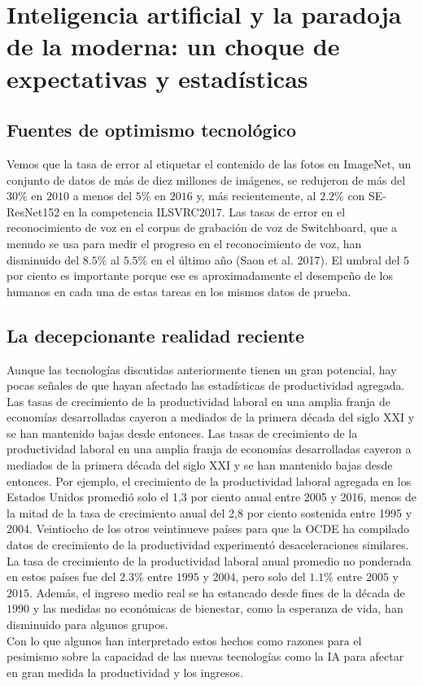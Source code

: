 \chapter{Inteligencia artificial y la paradoja de la moderna: un choque de expectativas y estadísticas}


\section{Fuentes de optimismo tecnológico}
Vemos que la tasa de error al etiquetar el contenido de las fotos en ImageNet, un conjunto de datos de más de diez millones de imágenes, se redujeron de más del $30\%$ en $2010$ a menos del $5\%$ en $2016$ y, más recientemente, al $2.2\%$ con SE-ResNet152 en la competencia ILSVRC2017. Las tasas de error en el reconocimiento de voz en el corpus de grabación de voz de Switchboard, que a menudo se usa para medir el progreso en el reconocimiento de voz, han disminuido del $8.5\%$ al $5.5\%$ en el último año (Saon et al. 2017). El umbral del $5$ por ciento es importante porque ese es aproximadamente el desempeño de los humanos en cada una de estas tareas en los mismos datos de prueba.

\section{La decepcionante realidad reciente}
Aunque las tecnologías discutidas anteriormente tienen un gran potencial, hay pocas señales de que hayan afectado las estadísticas de productividad agregada. Las tasas de crecimiento de la productividad laboral en una amplia franja de economías desarrolladas cayeron a mediados de la primera década del siglo XXI y se han mantenido bajas desde entonces. Las tasas de crecimiento de la productividad laboral en una amplia franja de economías desarrolladas cayeron a mediados de la primera década del siglo XXI y se han mantenido bajas desde entonces. Por ejemplo, el crecimiento de la productividad laboral agregada en los Estados Unidos promedió solo el 1,3 por ciento anual entre 2005 y 2016, menos de la mitad de la tasa de crecimiento anual del 2,8 por ciento sostenida entre 1995 y 2004. Veintiocho de los otros veintinueve países para que la OCDE ha compilado datos de crecimiento de la productividad experimentó desaceleraciones similares. La tasa de crecimiento de la productividad laboral anual promedio no ponderada en estos países fue del $2.3\%$ entre $1995$ y $2004$, pero solo del $1.1\%$ entre $2005$ y $2015$. Además, el ingreso medio real se ha estancado desde fines de la década de $1990$ y las medidas no económicas de bienestar, como la esperanza de vida, han disminuido para algunos grupos.\\
Con lo que algunos han interpretado estos hechos como razones para el pesimismo sobre la capacidad de las nuevas tecnologías como la IA para afectar en gran medida la productividad y los ingresos.

